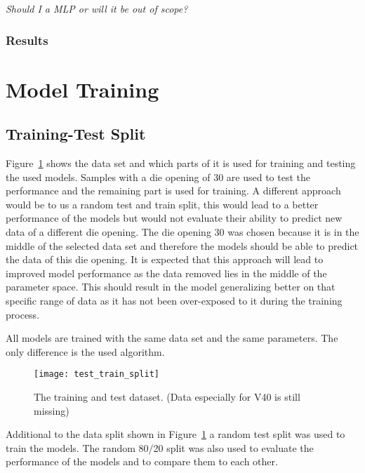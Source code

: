 \textit{Should I a MLP or will it be out of scope?}

\subsubsection*{Results}


\section{Model Training}\label{sec:model-training}

\subsection{Training-Test Split}\label{subsec:training-test-split}
Figure~\ref{fig:train_test_split} shows the data set and which parts of it is
used for training
and testing the used
models. Samples with a die opening of 30 are used to test the performance and
the remaining part
is used for training.
A different approach would be to us a random test and train split, this would
lead to a better
performance of the
models but would not evaluate their ability to predict new data of a
different die opening.
The die opening 30 was chosen because it is in the middle of the selected
data set and therefore
the models should be
able to predict the data of this die opening.
It is expected that this approach will lead to improved model performance as
the data removed
lies in the middle of the parameter space.
This should result in the model generalizing better on that specific range of
data as it has not
been over-exposed to it during the training process.

All models are trained with the same data set and the same parameters. The
only difference is the
used algorithm.

\begin{figure}[H]
    \begin{tcolorbox}[arc=0pt,boxrule=0.5pt]
        \centering
        \texttt{[image: test\_train\_split]}
        \caption{The training and test dataset. (Data especially for V40 is
        still missing)}
        \label{fig:train_test_split}
    \end{tcolorbox}
\end{figure}

Additional to the data split shown in Figure~\ref{fig:train_test_split} a
random test split was
used to train the
models. The random 80/20 split was also used to evaluate the performance of
the models and to
compare them to each
other.

